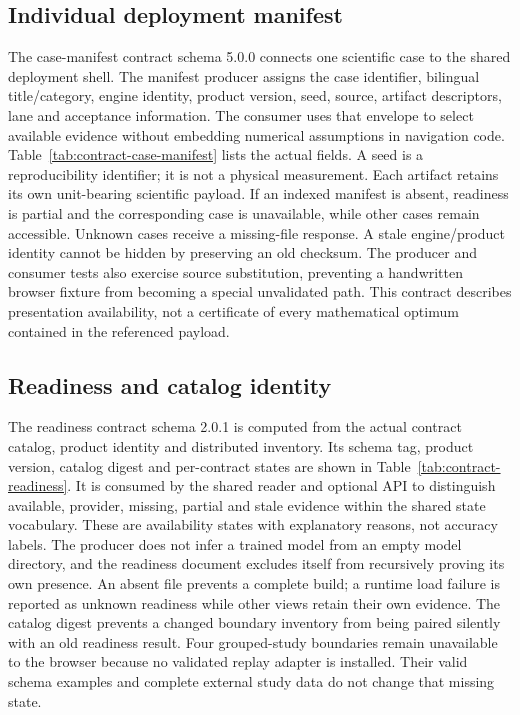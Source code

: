 \subsection{Individual deployment manifest}\label{sec:contract-case-manifest}
The case-manifest contract schema 5.0.0 connects one scientific case to the
shared deployment shell. The manifest producer assigns the case identifier,
bilingual title/category, engine identity, product version, seed, source,
artifact descriptors, lane and acceptance information. The consumer uses that
envelope to select available evidence without embedding numerical assumptions
in navigation code. Table~\ref{tab:contract-case-manifest} lists the actual
fields. A seed is a reproducibility identifier; it is not a physical measurement.
Each artifact retains its own unit-bearing scientific payload. If an indexed
manifest is absent, readiness is partial and the corresponding case is unavailable,
while other cases remain accessible. Unknown cases receive a missing-file response.
A stale engine/product identity cannot be hidden by preserving an old checksum.
The producer and consumer tests also exercise source substitution, preventing a
handwritten browser fixture from becoming a special unvalidated path. This
contract describes presentation availability, not a certificate of every
mathematical optimum contained in the referenced payload.


\subsection{Readiness and catalog identity}\label{sec:contract-readiness}
The readiness contract schema 2.0.1 is computed from the actual contract catalog,
product identity and distributed inventory. Its schema tag, product version,
catalog digest and per-contract states are shown in Table~\ref{tab:contract-readiness}.
It is consumed by the shared reader and optional API to distinguish available,
provider, missing, partial and stale evidence within the shared state vocabulary.
These are availability states with explanatory reasons, not accuracy labels.
The producer does not infer a trained model from an empty model directory, and
the readiness document excludes itself from recursively proving its own presence.
An absent file prevents a complete build; a runtime load failure is reported
as unknown readiness while other views retain their own evidence. The catalog
digest prevents a changed boundary inventory from being paired silently with an
old readiness result. Four grouped-study boundaries remain unavailable to the
browser because no validated replay adapter is installed. Their valid schema
examples and complete external study data do not change that missing state.


